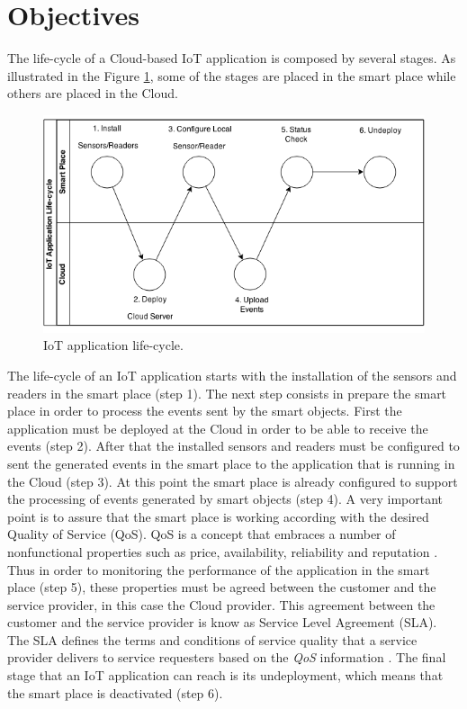 \section{Objectives}
\label{sec:objectives}
The life-cycle of a Cloud-based IoT application is composed by several stages. As illustrated in the Figure \ref{fig:life-cycle}, some of the stages are placed in
the smart place while others are placed in the Cloud.
\begin{figure}[h!]
  \centering
  \includegraphics[width=\textwidth]{./images/life-cycle}
  \caption{IoT application life-cycle.}
  \label{fig:life-cycle}
\end{figure}

The life-cycle of an IoT application starts with the installation of the sensors and readers in the smart place (step 1). The next step consists in prepare the
smart place in order to process the events sent by the smart objects. First the application must be deployed at the Cloud in order to be able to receive the events (step 2).
After that the installed sensors and readers must be configured to sent the generated events in the smart place to the application that is running in the Cloud (step 3).
At this point the smart place is already configured to support the processing of events generated by smart objects (step 4). A very important point is to assure that the smart place is working according with the desired Quality of Service (QoS). QoS is a concept that embraces a number of nonfunctional
properties such as price, availability, reliability and reputation \cite{o2002s}. Thus in order to monitoring the performance of the application in the smart place (step 5), these properties
must be agreed between the customer and the service provider, in this case the Cloud provider. This agreement between the customer and the service provider is know as Service Level Agreement (SLA).
The SLA defines the terms and conditions of service quality that a service provider delivers to service requesters based on the \textit{QoS} information \cite{zeng2004qos}.
The final stage that an IoT application can reach is its undeployment, which means that the smart place is deactivated (step 6).\\


